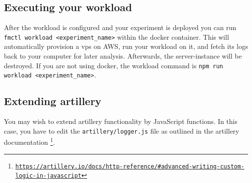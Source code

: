 \documentclass[../main.tex]{subfiles}
\begin{document}
\subsection{Executing your workload}

After the workload is configured and your experiment is deployed you can run \texttt{fmctl workload <experiment\_name>} 
within the docker container. This will automatically provision a vps on AWS, run your workload on it, and
fetch its logs back to your computer for later analysis. Afterwards, the server-instance will be destroyed.
If you are not using docker, the workload command is \texttt{npm run workload <experiment\_name>}.

\subsection{Extending artillery}

You may wish to extend artillery functionality by JavaScript functions.
In this case, you have to edit the \texttt{artillery/logger.js} file as outlined in the artillery documentation%
\footnote{\href{https://artillery.io/docs/http-reference}%
{\texttt{https://artillery.io/docs/http-reference/\#advanced-writing-custom-logic-in-javascript}}}.
\end{document}
